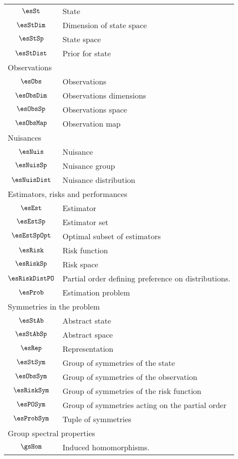 \begin{longtable}{cl}
 \hline
$\esSt$ &  State\\ 
 $\esStDim$ &  Dimension of state space\\ 
 $\esStSp$ &  State space\\ 
 $\esStDist$ &  Prior for state\\ 
 \multicolumn{2}{l}{Observations}\\ 
 \hline
$\esObs$ &  Observations\\ 
 $\esObsDim$ &  Observations dimensions\\ 
 $\esObsSp$ &  Observations space\\ 
 $\esObsMap$ &  Observation map\\ 
 \multicolumn{2}{l}{Nuisances}\\ 
 \hline
$\esNuis$ &  Nuisance\\ 
 $\esNuisSp$ &  Nuisance group\\ 
 $\esNuisDist$ &  Nuisance distribution\\ 
 \multicolumn{2}{l}{Estimators, risks and performances}\\ 
 \hline
$\esEst$ &  Estimator\\ 
 $\esEstSp$ &  Estimator set\\ 
 $\esEstSpOpt$ &  Optimal subset of estimators\\ 
 $\esRisk$ &  Risk function\\ 
 $\esRiskSp$ &  Risk space\\ 
 $\esRiskDistPO$ &  Partial order defining preference on distributions.\\ 
 $\esProb$ &  Estimation problem\\ 
 \multicolumn{2}{l}{Symmetries in the problem}\\ 
 \hline
$\esStAb$ &  Abstract state\\ 
 $\esStAbSp$ &  Abstract space\\ 
 $\esRep$ &  Representation\\ 
 $\esStSym$ &  Group of symmetries of the state\\ 
 $\esObsSym$ &  Group of symmetries of the observation\\ 
 $\esRiskSym$ &  Group of symmetries of the risk function\\ 
 $\esPOSym$ &  Group of symmetries acting on the partial order\\ 
 $\esProbSym$ &  Tuple of symmetries\\ 
 \multicolumn{2}{l}{Group spectral properties}\\ 
 \hline
$\gsHom$ &  Induced homomorphisms.\\ 

\end{longtable}
